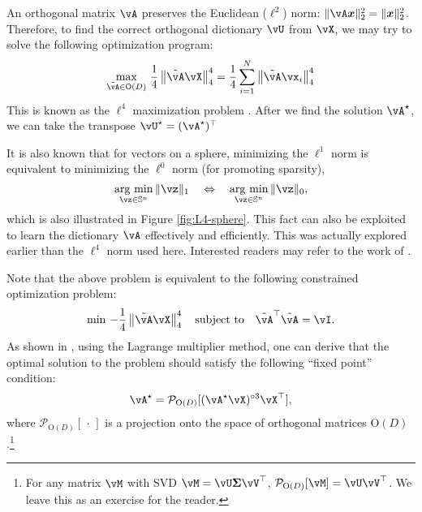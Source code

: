 \documentclass[../../book-main.tex]{subfiles}
\begin{document}
An orthogonal matrix $\vA$ preserves the Euclidean (\(\ell^{2}\)) norm: $\|\vA \x\|_2^2 = \|\x\|_2^2$. Therefore, to find the correct orthogonal dictionary $\vU$ from $\vX$, we may try to solve the following optimization program:
\begin{equation}\label{eq0:orthogonal-dictionary-learning-l4}
    \max_{\tilde{\vA} \in \O(D)}\,
     \frac{1}{4} \norm*{
    \tilde{\vA} \vX
    }_4^4 =  \frac{1}{4} \sum_{i=1}^N \norm*{
        \tilde{\vA} \vx_i
    }_4^4
\end{equation}
This is known as the $\ell^4$ maximization problem \cite{Zhai-2020}. After we
find the solution \(\vA^{\star}\), we can take the transpose \(\vU^{\star}
= (\vA^{\star})^{\top}\)
\begin{remark}
    It is also known that for vectors on a sphere, minimizing the $\ell^1$ norm is equivalent to minimizing the $\ell^0$ norm (for promoting sparsity),
\begin{equation*}
            \argmin_{\vz \in \mathbb{S}^n}\|\vz\|_{1}\quad\Leftrightarrow\quad \argmin_{\vz \in \mathbb{S}^n}\|\vz\|_{0},
\end{equation*}
which is also illustrated in Figure \ref{fig:L4-sphere}. This fact can also be exploited to learn the dictionary $\vA$ effectively and efficiently. This was actually explored earlier than the $\ell^4$ norm used here. Interested readers may refer to the work of \cite{qu2020findingsparsestvectorssubspace}.
\end{remark}

Note that the above problem is equivalent to the following constrained optimization problem:
\begin{equation}\label{eq:orthogonal-dictionary-learning-l4}
    \min\,
    -   \frac{1}{4} \norm*{
    \tilde{\vA} \vX
    }_4^4 \quad \mbox{subject to} \quad  \tilde{\vA}^\top\tilde{\vA} = \vI.
\end{equation}
As shown in \cite{Wright-Ma-2022}, using the Lagrange multiplier method, one can derive that the optimal solution to the problem should satisfy the following 
``fixed point'' condition:
\begin{equation}
    \vA^{\star} = \mathcal{P}_{\mathrm O(D)}[( {\vA^{\star} \vX})^{\circ3}\vX^\top],
\end{equation}
where $\mathcal{P}_{\mathrm O(D)}[\,\cdot\,]$ is a projection onto the space of
orthogonal matrices $\mathrm O(D)$.\footnote{For any matrix $\vM$ with SVD $\vM = \vU\bm \Sigma \vV^\top$, $\mathcal{P}_{\mathrm O(D)}[\vM] = \vU \vV^\top$. We leave this as an exercise for the reader.} 
\end{document}
